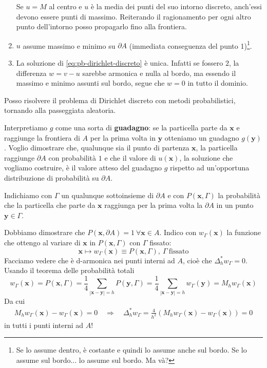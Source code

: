 \documentclass[10pt,a4paper,twoside,openright]{book}
\newcommand{\x}{\mathbf{x}}
\newcommand{\y}{\mathbf{y}}
\begin{document}
\begin{enumerate}
\begin{figure}[htpb]
\begin{tikzpicture}[x=0.75pt,y=0.75pt,yscale=-1,xscale=1]
	      	\end{tikzpicture}
		\end{figure}
		\FloatBarrier
		Se $u=M$ al centro e $u$ è la media dei punti del suo intorno discreto, anch'essi devono essere punti di massimo. Reiterando il ragionamento per ogni altro punto dell'intorno posso propagarlo fino alla frontiera.
	\item $u$ assume massimo e minimo su $\partial A$ (immediata conseguenza del punto 1)\footnote{Se lo assume dentro, è costante e quindi lo assume anche sul bordo. Se lo assume sul bordo... lo assume sul bordo. Ma và?}.
	\item La soluzione di \eqref{eq:pb-dirichlet-discreto} è unica. Infatti se fossero $2$, la differenza $w=v-u$ sarebbe armonica e nulla al bordo, ma essendo il massimo e minimo assunti sul bordo, segue che $w=0$ in tutto il dominio.
\end{enumerate}
Posso risolvere il problema di Dirichlet discreto con metodi probabilistici, tornando alla passeggiata aleatoria. 

Interpretiamo $g$ come una sorta di \textbf{guadagno}: se la particella parte da $\x$ e raggiunge la frontiera di $A$ per la prima volta in $\y$ otteniamo un guadagno $g(\y)$. Voglio dimostrare che, qualunque sia il punto di partenza $\x$, la particella raggiunge $\partial A$ con probabilità $1$ e che il valore di $u(\x)$, la soluzione che vogliamo costruire, è il valore atteso del guadagno $g$ rispetto ad un'opportuna distribuzione di probabilità su $\partial A$. 

Indichiamo con $\Gamma $ un qualunque sottoinsieme di $\partial A$ e con $P(\x,\Gamma)$ la probabilità che la particella che parte da $\x$ raggiunga per la prima volta la $\partial A$ in un punto $\y\in \Gamma $. 

Dobbiamo dimostrare che $P(\x,\partial A) =1\ \forall \x\in A$. Indico con $w_{\Gamma }(\x)$ la funzione che ottengo al variare di $\x$ in $P(\x,\Gamma)$ con $\Gamma $ fissato:
\begin{equation*}
	\x\longmapsto w_{\Gamma }(\x) \equiv P(\x,\Gamma),\ \Gamma \ \text{fissato}
\end{equation*}
Facciamo vedere che è d-armonica nei punti interni ad $A$, cioè che $\Delta ^{*}_{h} w_{\Gamma } =0$. Usando il teorema delle probabilità totali
\begin{equation*}
	w_{\Gamma }(\x) =P(\x,\Gamma) =\frac{1}{4}\sum _{| \x-\y| =h} P(\y,\Gamma) =\frac{1}{4}\sum _{| \x-\y| =h} w_{\Gamma }(\y) =M_{h} w_{\Gamma }(\x)
\end{equation*}
Da cui
\begin{gather*}
	M_{h} w_{\Gamma }(\x) -w_{\Gamma }(\x) =0 \quad \Rightarrow \quad \Delta ^{*}_{h} w_{\Gamma } =\frac{4}{h^{2}}(M_{h} w_{\Gamma }(\x) -w_{\Gamma }(\x)) =0
\end{gather*}
in tutti i punti interni ad $A$!
\end{document}
